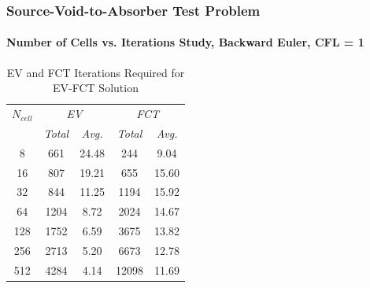 \begin{frame}
\frametitle{Source-Void-to-Absorber Test Problem}
\framesubtitle{Number of Cells vs. Iterations Study, Backward Euler, CFL = 1}

\begin{center}
\begin{table}[h]
\caption{EV and FCT Iterations Required for EV-FCT Solution}
\begin{tabular}{c c c c c}\toprule
$N_{cell}$ & \multicolumn{2}{c}{\emph{EV}} & \multicolumn{2}{c}{\emph{FCT}}\\
           & \emph{Total} & \emph{Avg.}    &  \emph{Total} & \emph{Avg.}\\\midrule
  8 &  661 & 24.48 &   244 &  9.04\\
 16 &  807 & 19.21 &   655 & 15.60\\
 32 &  844 & 11.25 &  1194 & 15.92\\
 64 & 1204 &  8.72 &  2024 & 14.67\\
128 & 1752 &  6.59 &  3675 & 13.82\\
256 & 2713 &  5.20 &  6673 & 12.78\\
512 & 4284 &  4.14 & 12098 & 11.69\\
\bottomrule\end{tabular}
\end{table}
\end{center}

\end{frame}
